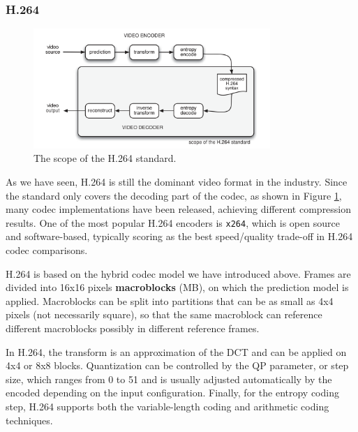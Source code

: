 
\subsubsection{H.264}
\label{sec:bg/compression/codecs/h264}

\begin{figure}
	\centering
	
	\includegraphics[width=0.8\textwidth]{res/h264_scope.png}
	
	\caption{The scope of the H.264 standard.}
	\label{fig:h264_scope}
\end{figure}

As we have seen, H.264 is still the dominant video format in the industry. Since the standard only covers the decoding part of the codec, as shown in Figure \ref{fig:h264_scope}, many codec implementations have been released, achieving different compression results. One of the most popular H.264 encoders is \texttt{x264}, which is open source and software-based, typically scoring as the best speed/quality trade-off in H.264 codec comparisons.\cite{msu2021}

H.264 is based on the hybrid codec model we have introduced above. Frames are divided into 16x16 pixels \textbf{macroblocks} (MB), on which the prediction model is applied. Macroblocks can be split into partitions that can be as small as 4x4 pixels (not necessarily square), so that the same macroblock can reference different macroblocks possibly in different reference frames.

In H.264, the transform is an approximation of the DCT and can be applied on 4x4 or 8x8 blocks. Quantization can be controlled by the QP parameter, or step size, which ranges from 0 to 51 and is usually adjusted automatically by the encoded depending on the input configuration. Finally, for the entropy coding step, H.264 supports both the variable-length coding and arithmetic coding techniques.

